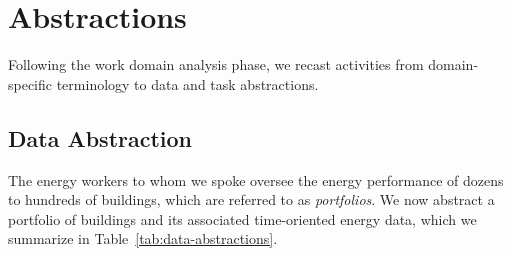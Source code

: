 \documentclass[journal]{vgtc}                %
\begin{document}
\section{Abstractions}
\label{abstractions}


Following the work domain analysis phase, we recast activities from domain-specific terminology to data and task abstractions.


\subsection{Data Abstraction}
\label{data-abstractions}


The energy workers to whom we spoke oversee the energy performance of dozens to hundreds of buildings, which are referred to as {\it portfolios}. 
We now abstract a portfolio of buildings and its associated time-oriented energy data, which we summarize in Table~\ref{tab:data-abstractions}.
\end{document}

